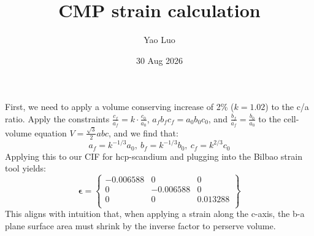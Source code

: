 \documentclass[11pt]{article}
\title{CMP strain calculation}
\author{Yao Luo}
\date{30 Aug 2026}
\begin{document}
\maketitle
First, we need to apply a volume conserving increase of 2\% ($k=1.02$) to the c/a ratio. Apply the constraints $\frac{c_f}{a_f}=k\cdot \frac{c_0}{a_0}$, ${a_f}{b_f}c_f=a_0b_0c_0$, and $\frac{b_f}{a_f} = \frac{b_0}{a_0}$ to the cell-volume equation $V=\frac{\sqrt{3}}{2}abc$, and we find that: \[a_f = k^{-1/3}a_0,\ b_f = k^{-1/3}b_0,\ c_f = k^{2/3}c_0\]
Applying this to our CIF for hcp-scandium and plugging into the Bilbao strain tool yields:
\[\boldsymbol{\epsilon} = 
\begin{Bmatrix}
    -0.006588 & 0 & 0 \\
    0 & -0.006588 & 0 \\
    0 & 0 & 0.013288 \\
\end{Bmatrix}    
\]
This aligns with intuition that, when applying a strain along the c-axis, the b-a plane surface area must shrink by the inverse factor to perserve volume.
\end{document}
